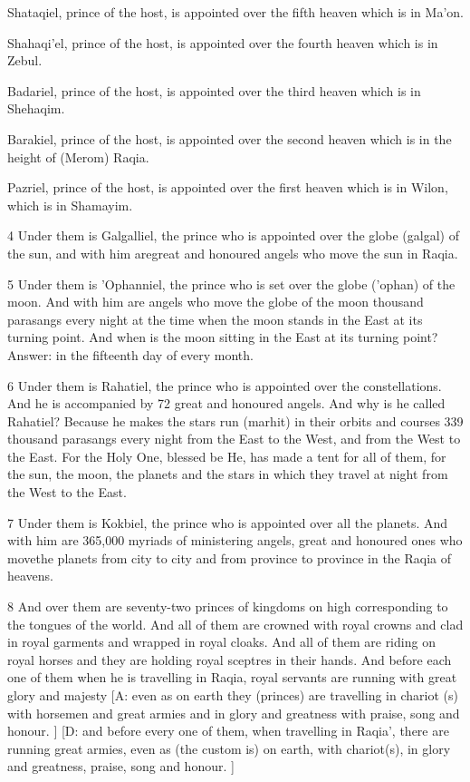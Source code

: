 \par Shataqiel, prince of the host, is appointed over the fifth heaven which is in Ma'on.

\par Shahaqi'el, prince of the host, is appointed over the fourth heaven which is in Zebul.

\par Badariel, prince of the host, is appointed over the third heaven which is in Shehaqim. 

\par Barakiel, prince of the host, is appointed over the second heaven which is in the height of (Merom) Raqia.

\par Pazriel, prince of the host, is appointed over the first heaven which is in Wilon, which is in Shamayim. 

\par 4 Under them is Galgalliel, the prince who is appointed over the globe (galgal) of the sun, and with him aregreat and honoured angels who move the sun in Raqia.

\par 5 Under them is 'Ophanniel, the prince who is set over the globe ('ophan) of the moon. And with him are angels who move the globe of the moon thousand parasangs every night at the time when the moon stands in the East at its turning point. And when is the moon sitting in the East at its turning point? Answer: in the fifteenth day of every month.

\par 6 Under them is Rahatiel, the prince who is appointed over the constellations. And he is accompanied by 72 great and honoured angels. And why is he called Rahatiel? Because he makes the stars run (marhit) in their orbits and courses 339 thousand parasangs every night from the East to the West, and from the West to the East. For the Holy One, blessed be He, has made a tent for all of them, for the sun, the moon, the planets and the stars in which they travel at night from the West to the East. 

\par 7 Under them is Kokbiel, the prince who is appointed over all the planets. And with him are 365,000 myriads of ministering angels, great and honoured ones who movethe planets from city to city and from province to province in the Raqia of heavens. 

\par 8 And over them are seventy-two princes of kingdoms on high corresponding to the tongues of the world. And all of them are crowned with royal crowns and clad in royal garments and wrapped in royal cloaks. And all of them are riding on royal horses and they are holding royal sceptres in their hands. And before each one of them when he is travelling in Raqia, royal servants are running with great glory and majesty [A: even as on earth they (princes) are travelling in chariot (s) with horsemen and great armies and in glory and greatness with praise, song and honour. ] [D: and before every one of them, when travelling in Raqia', there are running great armies, even as (the custom is) on earth, with chariot(s), in glory and greatness, praise, song and honour. ]


